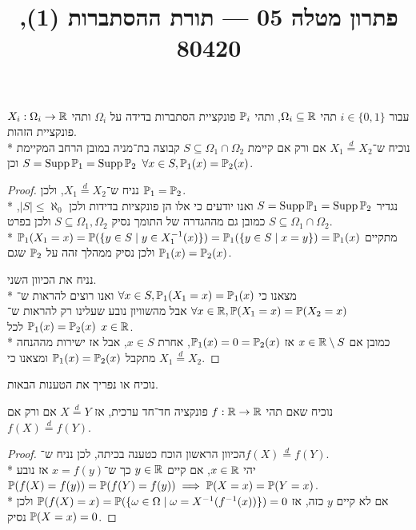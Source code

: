 
\title{פתרון מטלה 05 --- תורת ההסתברות (1), 80420}

\DeclareMathOperator{\Supp}{Supp}


\maketitle
\maketitleprint{}

\Question{}
עבור $i \in \{0, 1\}$ תהי $\Omega_i \subseteq \mathbb{R}$, ותהי $\mathbb{P}_i$ פונקציית הסתברות בדידה על $\Omega_i$ ותהי $X_i : \Omega_i \to \mathbb{R}$ פונקציית הזהות. \\*
נוכיח ש־$X_1 \overset{d}{=} X_2$ אם ורק אם קיימת  $S \subseteq \Omega_1 \cap \Omega_2$ קבוצה בת־מניה במובן הרחב המקיימת $S = \Supp \PP_1 = \Supp \PP_2$ וכן $\forall x \in S, \mathbb{P}_1(x) = \mathbb{P}_2(x)$.
\begin{proof}
	נניח ש־$X_1 \overset{d}{=} X_2$, ולכן $\mathbb{P}_1 = \mathbb{P}_2$. \\*
	נגדיר $S = \Supp \PP_1 = \Supp \PP_2$ ואנו יודעים כי אלו הן פונקציות בדידות ולכן $|S| \le \aleph_0$, כמובן גם מההגדרה של התומך נסיק $S \subseteq \Omega_1, \Omega_2$ ולכן בפרט $S \subseteq \Omega_1 \cap \Omega_2$. \\*
	מתקיים $\mathbb{P}_1(X_1 = x) = \mathbb{P}(\{ y \in S \mid y \in X_1^{-1}(x) \}) = \mathbb{P}_1(\{ y \in S \mid x = y \}) = \mathbb{P}_1(x)$ ולכן נסיק ממהלך זהה על $\mathbb{P}_2$ שגם $\mathbb{P}_1(x) = \mathbb{P}_2(x)$.

	נניח את הכיוון השני. \\*
	מצאנו כי $\forall x \in S, \mathbb{P}_1(X_1 = x) = \mathbb{P}_1(x)$ ואנו רוצים להראות ש־$\forall x \in \mathbb{R}, \mathbb{P}(X_1 = x) = \mathbb{P}(X_2 = x)$ אבל מהשוויון נובע שעלינו רק להראות ש־$\mathbb{P}_1(x) = \mathbb{P}_2(x)$  לכל $x \in \mathbb{R}$. \\*
	כמובן אם $x \in \mathbb{R} \setminus S$ אז $\mathbb{P}_1(x) = 0 = \mathbb{P}_2(x)$, אחרת $x \in S$, אבל אז ישירות מההנחה מתקבל $\mathbb{P}_1(x) = \mathbb{P}_2(x)$ ומצאנו כי $X_1 \overset{d}{=} X_2$.
\end{proof}

\Question{}
נוכיח או נפריך את הטענות הבאות.

\Subquestion{}
נוכיח שאם תהי $f : \mathbb{R} \to \mathbb{R}$ פונקציה חד־חד ערכית, אז $X \overset{d}{=} Y$ אם ורק אם $f(X) \overset{d}{=} f(Y)$.
\begin{proof}
	הכיוון הראשון הוכח כטענה בכיתה, לכן נניח ש־$f(X) \overset{d}{=} f(Y)$. \\*
	יהי $x \in \mathbb{R}$, אם קיים $y \in \mathbb{R}$ כך ש־$x = f(y)$ אז נובע $\mathbb{P}(f(X) = f(y)) = \mathbb{P}(f(Y) = f(y)) \implies \mathbb{P}(X = x) = \mathbb{P}(Y = x)$. \\*
	אם לא קיים $y$ כזה, אז $\mathbb{P}(f(X) = x) = \mathbb{P}(\{\omega \in \Omega \mid \omega = X^{-1}(f^{-1}(x))\}) = 0$ ולכן נסיק $\mathbb{P}(X = x) = 0$.
\end{proof}

